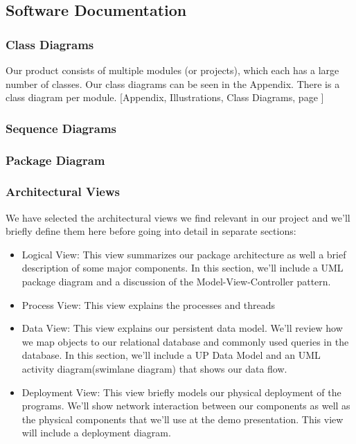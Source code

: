 \subsection{Software Documentation}
\subsubsection{Class Diagrams}
Our product consists of multiple modules (or projects), which each has a large number of classes. Our class diagrams can be seen in the Appendix. There is a class diagram per module.
[Appendix, Illustrations, Class Diagrams, page \pageref{classdiagrams}]
\subsubsection{Sequence Diagrams}
\subsubsection{Package Diagram}
\subsubsection{Architectural Views}
We have selected the architectural views we find relevant in our project and we’ll briefly define them here before going into detail in separate sections:
\begin{itemize}
\item Logical View: This view summarizes our package architecture as well a brief description of some major components. In this section, we’ll include a UML package diagram and a discussion of the Model-View-Controller pattern.
\item Process View: This view explains the processes and threads
\item Data View: This view explains our persistent data model. We’ll review how we map objects to our relational database and commonly used queries in the database. In this section, we’ll include a UP Data Model and an UML activity diagram(swimlane diagram) that shows our data flow.
\item Deployment View: This view briefly models our physical deployment of the programs. We’ll show network interaction between our components as well as the physical components that we’ll use at the demo presentation. This view will include a deployment diagram.
\end{itemize}